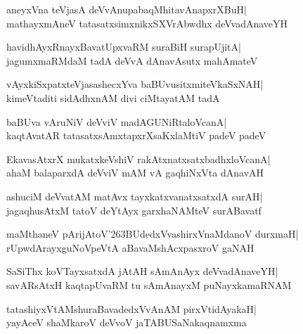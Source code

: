 \documentclass[twoside,12pt,openright]{book}
\def\S{\char'263}
\newcounter{shloka}[chapter]
\begin{document}
\begin{shloka}%
aneyxVna teVjasA deVvAnupabaqMhitavAnapxrXBuH|\\
mathayxmAneV tatasatxsimxnikxSXVrAbwdhx deVvadAnaveYH
\end{shloka}

\begin{shloka}%
havidhAyxRnayxBavatUpxvaRM suraBiH surapUjitA|\\
jagumxmaRMdaM tadA deVvA dAnavAsutx mahAmateV
\end{shloka}

\begin{shloka}%
vAyxkiSxpatxteVjasashecxYva baBUvusitxmiteVkaSxNAH|\\
kimeVtaditi sidAdhxnAM divi ciMtayatAM tadA
\end{shloka}

\begin{shloka}%
baBUva vAruNiV deVviV madAGUNiRtaloVcanA|\\
kaqtAvatAR tatasatxsAmxtapxrXsaKxlaMtiV padeV padeV
\end{shloka}

\begin{shloka}%
EkavasAtxrX mukatxkeVshiV rakAtxnatxsatxbadhxloVcanA|\\
ahaM balaparxdA deVviV mAM vA gaqhiNxVta dAnavAH
\end{shloka}

\begin{shloka}%
ashuciM deVvatAM matAvx tayxkatxvanatxsatxdA surAH|\\
jagaqhusAtxM tatoV deYtAyx garxhaNAMteV surABavatf
\end{shloka}

\begin{shloka}%
maMthaneV pArijAtoV\S BUdedxVvashirxVnaMdanoV durxmaH|\\
rUpwdArayxguNoVpeVtA aBavaMshAcxpasxroV gaNAH
\end{shloka}

\begin{shloka}%
SaSiThx koVTayxsatxdA jAtAH sAmAnAyx deVvadAnaveYH|\\
savARsAtxH kaqtapUvaRM tu sAmAnayxM puNayxkamaRNAM
\end{shloka}

\begin{shloka}%
tatashiyxVtAMshuraBavadedxVvAnAM pirxVtidAyakaH|\\
yayAceV shaMkaroV deVvoV jaTABUSaNakaqnamxma
\end{shloka}
\end{document}
